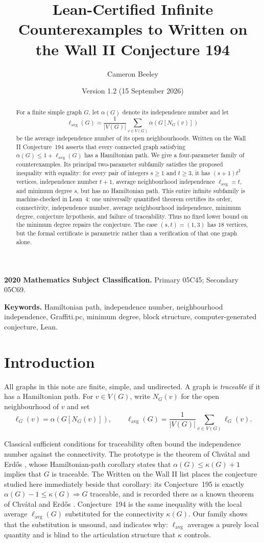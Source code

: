 \documentclass[11pt]{article}
\title{Lean-Certified Infinite Counterexamples to Written on the Wall II Conjecture 194}
\author{Cameron Beeley}
\date{Version 1.2 (15 September 2026)}
\newcommand{\lavg}{\ell_{\mathrm{avg}}}
\begin{document}
\maketitle

\begin{abstract}
For a finite simple graph $G$, let $\alpha(G)$ denote its independence number and let
\[
  \lavg(G)=\frac{1}{|V(G)|}\sum_{v\in V(G)}\alpha(G[N_G(v)])
\]
be the average independence number of its open neighbourhoods.  Written on the Wall II
Conjecture~194 asserts that every connected graph satisfying
$\alpha(G)\leq 1+\lavg(G)$ has a Hamiltonian path.  We give a four-parameter family of
counterexamples.  Its principal two-parameter subfamily satisfies the proposed inequality
with equality: for every pair of integers $s\geq 1$ and $t\geq 3$, it has $(s+1)t^2$
vertices, independence number $t+1$, average neighbourhood independence $\lavg=t$, and
minimum degree $s$, but has no Hamiltonian path.  This entire infinite subfamily is
machine-checked in Lean~4: one universally quantified theorem certifies its order,
connectivity, independence number, average neighbourhood independence, minimum degree,
conjecture hypothesis, and failure of traceability.  Thus no fixed lower bound on the
minimum degree repairs the conjecture.  The case $(s,t)=(1,3)$ has $18$ vertices, but the
formal certificate is parametric rather than a verification of that one graph alone.
\end{abstract}

\medskip
\noindent\textbf{2020 Mathematics Subject Classification.}
Primary 05C45; Secondary 05C69.

\noindent\textbf{Keywords.}
Hamiltonian path, independence number, neighbourhood independence, Graffiti.pc,
minimum degree, block structure, computer-generated conjecture, Lean.

\section{Introduction}

All graphs in this note are finite, simple, and undirected.  A graph is \emph{traceable} if
it has a Hamiltonian path.  For $v\in V(G)$, write $N_G(v)$ for the open neighbourhood of
$v$ and set
\[
  \ell_G(v)=\alpha(G[N_G(v)]),
  \qquad
  \lavg(G)=\frac{1}{|V(G)|}\sum_{v\in V(G)}\ell_G(v).
\]

Classical sufficient conditions for traceability often bound the independence number
against the connectivity.  The prototype is the theorem of Chv\'atal and Erd\H{o}s
\cite{chvatalerdos1972}, whose Hamiltonian-path corollary states that
$\alpha(G)\leq\kappa(G)+1$ implies that $G$ is traceable.  The Written on the Wall II list
places the conjecture studied here immediately beside that corollary: its Conjecture~195
is exactly $\alpha(G)-1\leq\kappa(G)\Rightarrow G$ traceable, and is recorded there as a
known theorem of Chv\'atal and Erd\H{o}s \cite{delavinaWOWII}.  Conjecture~194 is the same
inequality with the local average $\lavg(G)$ substituted for the connectivity $\kappa(G)$.
Our family shows that the substitution is unsound, and indicates why: $\lavg$ averages a
purely local quantity and is blind to the articulation structure that $\kappa$ controls.
\end{document}
